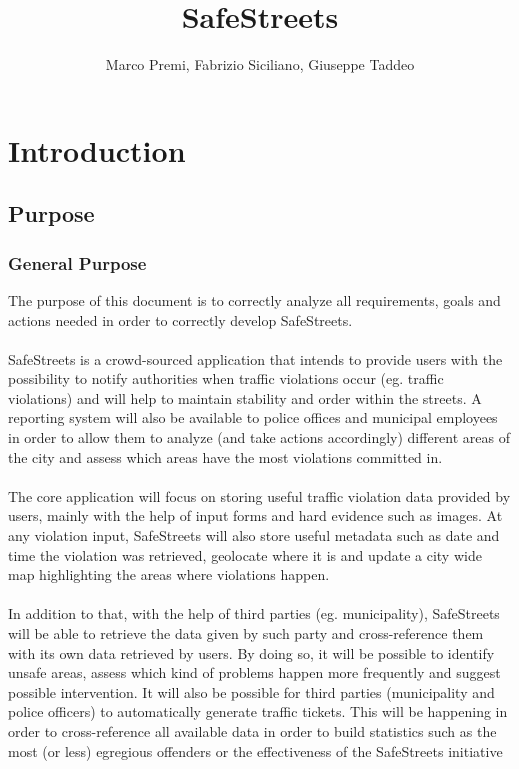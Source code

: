 \documentclass{article}
\title{SafeStreets}
\author{Marco Premi, Fabrizio Siciliano, Giuseppe Taddeo}
\begin{document}
\maketitle

\tableofcontents

\newpage
\section{Introduction}
\subsection{Purpose}
\subsubsection{General Purpose}
    The purpose of this document is to correctly analyze all requirements, goals 
    and actions needed in order to correctly develop SafeStreets.\\
    \\
    SafeStreets is a crowd-sourced application that intends to provide users with the possibility to notify authorities when
    traffic violations occur (eg. traffic violations) and will help to maintain stability and order within the streets. A reporting
    system will also be available to police offices and municipal employees in order to allow them to analyze (and take actions accordingly)
    different areas of the city and assess which areas have the most violations committed in.\\
    \\
    The core application will focus on storing useful traffic violation data provided by users, mainly with the help of input forms and
    hard evidence such as images. At any violation input, SafeStreets will also store useful metadata such as date and time the violation 
    was retrieved, geolocate where it is and update a city wide map highlighting the areas where violations happen.\\
    \\
    In addition to that, with the help of third parties (eg. municipality), SafeStreets will be able to retrieve the data given by such party
    and cross-reference them with its own data retrieved by users. By doing so, it will be possible to identify unsafe areas, assess which kind 
    of problems happen more frequently and suggest possible intervention. It will also be possible for third parties (municipality and police officers)
    to automatically generate traffic tickets. This will be happening in order to cross-reference all available data in order to build statistics such 
    as the most (or less) egregious offenders or the effectiveness of the SafeStreets initiative
\end{document}
